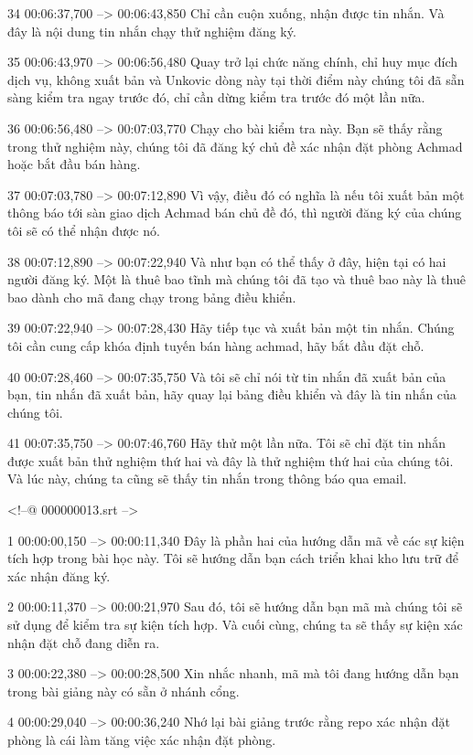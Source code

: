 34
00:06:37,700 --> 00:06:43,850
Chỉ cần cuộn xuống, nhận được tin nhắn.  Và đây là nội dung tin nhắn chạy thử nghiệm đăng ký.

35
00:06:43,970 --> 00:06:56,480
Quay trở lại chức năng chính, chỉ huy mục đích dịch vụ, không xuất bản và Unkovic dòng này tại thời điểm này chúng tôi đã sẵn sàng kiểm tra ngay trước đó, chỉ cần dừng kiểm tra trước đó một lần nữa.

36
00:06:56,480 --> 00:07:03,770
Chạy cho bài kiểm tra này.  Bạn sẽ thấy rằng trong thử nghiệm này, chúng tôi đã đăng ký chủ đề xác nhận đặt phòng Achmad hoặc bắt đầu bán hàng.

37
00:07:03,780 --> 00:07:12,890
Vì vậy, điều đó có nghĩa là nếu tôi xuất bản một thông báo tới sàn giao dịch Achmad bán chủ đề đó, thì người đăng ký của chúng tôi sẽ có thể nhận được nó.

38
00:07:12,890 --> 00:07:22,940
Và như bạn có thể thấy ở đây, hiện tại có hai người đăng ký.  Một là thuê bao tĩnh mà chúng tôi đã tạo và thuê bao này là thuê bao dành cho mã đang chạy trong bảng điều khiển.

39
00:07:22,940 --> 00:07:28,430
Hãy tiếp tục và xuất bản một tin nhắn.  Chúng tôi cần cung cấp khóa định tuyến bán hàng achmad, hãy bắt đầu đặt chỗ.

40
00:07:28,460 --> 00:07:35,750
Và tôi sẽ chỉ nói từ tin nhắn đã xuất bản của bạn, tin nhắn đã xuất bản, hãy quay lại bảng điều khiển và đây là tin nhắn của chúng tôi.

41
00:07:35,750 --> 00:07:46,760
Hãy thử một lần nữa.  Tôi sẽ chỉ đặt tin nhắn được xuất bản thử nghiệm thứ hai và đây là thử nghiệm thứ hai của chúng tôi.  Và lúc này, chúng ta cũng sẽ thấy tin nhắn trong thông báo qua email.

<!--@ 000000013.srt -->

1
00:00:00,150 --> 00:00:11,340
Đây là phần hai của hướng dẫn mã về các sự kiện tích hợp trong bài học này.  Tôi sẽ hướng dẫn bạn cách triển khai kho lưu trữ để xác nhận đăng ký.

2
00:00:11,370 --> 00:00:21,970
Sau đó, tôi sẽ hướng dẫn bạn mã mà chúng tôi sẽ sử dụng để kiểm tra sự kiện tích hợp.  Và cuối cùng, chúng ta sẽ thấy sự kiện xác nhận đặt chỗ đang diễn ra.

3
00:00:22,380 --> 00:00:28,500
Xin nhắc nhanh, mã mà tôi đang hướng dẫn bạn trong bài giảng này có sẵn ở nhánh cổng.

4
00:00:29,040 --> 00:00:36,240
Nhớ lại bài giảng trước rằng repo xác nhận đặt phòng là cái làm tăng việc xác nhận đặt phòng.

